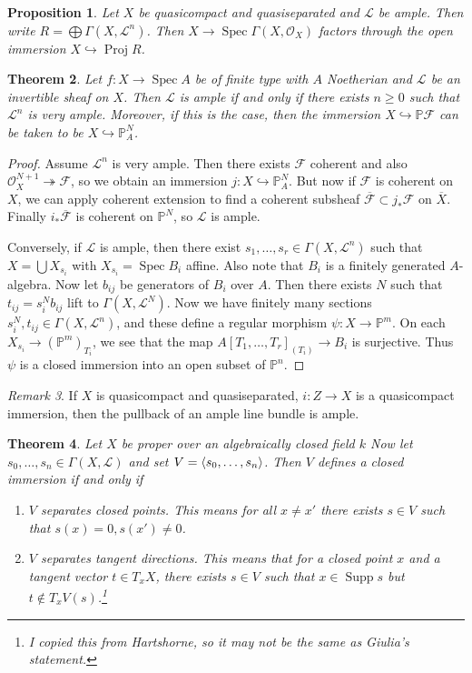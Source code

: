 \documentclass[leqno, openany]{memoir}
\newtheorem{thm}{Theorem}[section]
\newtheorem{prop}[thm]{Proposition}
\theoremstyle{definition}
\theoremstyle{remark}
\newtheorem{rmk}[thm]{Remark}
\theoremstyle{plain}
\theoremstyle{definition}
\theoremstyle{remark}
\renewcommand{\P}{\mathbb{P}}
\newcommand{\mc}[1]{\mathcal{#1}}
\newcommand{\ol}[1]{\overline{#1}}
\DeclareMathOperator{\Supp}{Supp}
\DeclareMathOperator{\Spec}{Spec}
\DeclareMathOperator{\Proj}{Proj}
\begin{document}
\begin{prop}
    Let $X$ be quasicompact and quasiseparated and $\mc{L}$ be ample. Then write $R = \bigoplus \Gamma(X, \mc{L}^n)$. Then $X \to \Spec \Gamma(X, \mc{O}_X)$ factors through the open immersion $X \hookrightarrow \Proj R$.
\end{prop}

\begin{thm}
    Let $f \colon X \to \Spec A$ be of finite type with $A$ Noetherian and $\mc{L}$ be an invertible sheaf on $X$. Then $\mc{L}$ is ample if and only if there exists $n \geq 0$ such that $\mc{L}^n$ is very ample. Moreover, if this is the case, then the immersion $X \hookrightarrow \P \mc{F}$ can be taken to be $X \hookrightarrow \P^N_A$.
\end{thm}

\begin{proof}
    Assume $\mc{L}^n$ is very ample. Then there exists $\mc{F}$ coherent and also $\mc{O}_X^{N+1} \twoheadrightarrow \mc{F}$, so we obtain an immersion $j \colon X \hookrightarrow \P^N_A$. But now if $\mc{F}$ is coherent on $X$, we can apply coherent extension to find a coherent subsheaf $\ol{\mc{F}} \subset j_* \mc{F}$ on $\ol{X}$. Finally $i_* \mc{\ol{F}}$ is coherent on $\P^N$, so $\mc{L}$ is ample.

    Conversely, if $\mc{L}$ is ample, then there exist $s_1, \ldots, s_r \in \Gamma(X, \mc{L}^n)$ such that $X = \bigcup X_{s_i}$ with $X_{s_i} = \Spec B_i$ affine. Also note that $B_i$ is a finitely generated $A$-algebra. Now let $b_{ij}$ be generators of $B_i$ over $A$. Then there exists $N$ such that $t_{ij} = s_i^N b_{ij}$ lift to $\Gamma(X, \mc{L}^N)$. Now we have finitely many sections $s_i^N, t_{ij} \in \Gamma(X, \mc{L}^n)$, and these define a regular morphism $\psi \colon X \to \P^m$. On each $X_{s_i} \to {(\P^m)}_{T_i}$, we see that the map ${A[T_1, \ldots, T_r]}_{(T_i)} \to B_i$ is surjective. Thus $\psi$ is a closed immersion into an open subset of $\P^n$.
\end{proof}

\begin{rmk}
    If $X$ is quasicompact and quasiseparated, $i \colon Z \to X$ is a quasicompact immersion, then the pullback of an ample line bundle is ample.
\end{rmk}

\begin{thm}
    Let $X$ be proper over an algebraically closed field $k$
    Now let $s_0, \ldots, s_n \in \Gamma(X, \mc{L})$ and set $V = \ev{s_0, \ldots, s_n}$. Then $V$ defines a closed immersion if and only if
    \begin{enumerate}
        \item $V$ separates closed points. This means for all $x \neq x'$ there exists $s \in V$ such that $s(x) = 0, s(x') \neq 0$.
        \item $V$ separates tangent directions. This means that for a closed point $x$ and a tangent vector $t \in T_x X$, there exists $s \in V$ such that $x \in \Supp s$ but $t \notin T_x V(s)$.\footnote{I copied this from Hartshorne, so it may not be the same as Giulia's statement.}
    \end{enumerate}
\end{thm}
\end{document}
